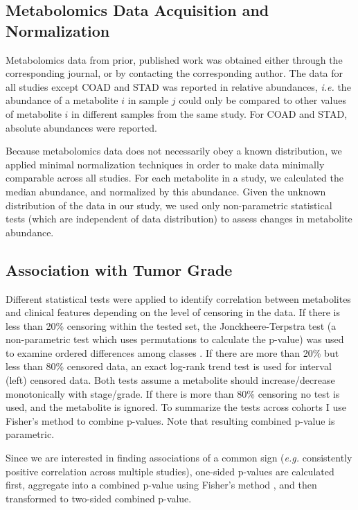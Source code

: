 \documentclass[10pt]{article}
\begin{document}
\subsection{Metabolomics Data Acquisition and Normalization}
Metabolomics data from prior, published work was obtained either through the corresponding journal, or by contacting the corresponding author. The data for all studies except COAD and STAD was reported in relative abundances, \textit{i.e.} the abundance of a metabolite $i$ in sample $j$ could only be compared to other values of metabolite $i$ in different samples from the same study. For COAD and STAD, absolute abundances were reported.

Because metabolomics data does not necessarily obey a known distribution, we applied minimal normalization techniques in order to make data minimally comparable across all studies. For each metabolite in a study, we calculated the median abundance, and normalized by this abundance. Given the unknown distribution of the data in our study, we used only non-parametric statistical tests (which are independent of data distribution) to assess changes in metabolite abundance.

\subsection{Association with Tumor Grade}
Different statistical tests were applied to identify correlation between metabolites and clinical features depending on the level of censoring in the data. If there is less than 20\% censoring within the tested set, the Jonckheere-Terpstra test (a non-parametric test which uses permutations to calculate the p-value) was used to examine ordered differences among classes . If there are more than 20\% but less than 80\% censored data, an exact log-rank trend test is used for interval (left) censored data. Both tests assume a metabolite should increase/decrease monotonically with stage/grade.  If there is more than 80\% censoring no test is used, and the metabolite is ignored. To summarize the tests across cohorts I use Fisher’s method to combine p-values. Note that resulting combined p-value is parametric. 

Since we are interested in finding associations of a common sign (\textit{e.g.} consistently positive correlation across multiple studies), one-sided p-values are calculated first, aggregate into a combined p-value using Fisher's method \cite{Whitlock2005}, and then transformed to two-sided combined p-value.
\end{document}
